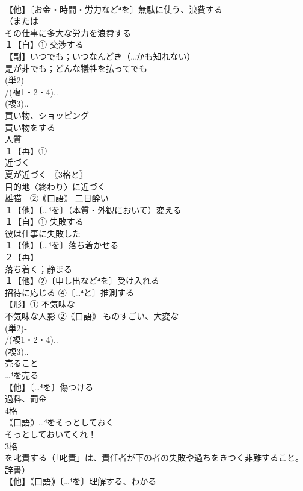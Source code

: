 \documentclass[8pt]{extreport}
\begin{document}
\begin{CJK}{UTF8}{min}
\\	【他】〔お金・時間・労力など⁴を〕無駄に使う、浪費する
\\	（または
\\	その仕事に多大な労力を浪費する
\\	１【自】① 交渉する 
\\	【副】いつでも；いつなんどき（…かも知れない）
\\	是が非でも；どんな犠牲を払ってでも
\\	(単2)‐
\\	/(複1・2・4)..
\\	(複3)..
\\	買い物、ショッピング 
\\	買い物をする
\\	人質 
\\	１【再】①
\\	近づく 
\\	夏が近づく 〖3格と〗
\\	目的地〈終わり〉に近づく
\\	雄猫　②｟口語｠ 二日酔い
\\	１【他】〔…⁴を〕（本質・外観において）変える
\\	１【自】① 失敗する 
\\	彼は仕事に失敗した 
\\	１【他】〔…⁴を〕落ち着かせる
\\	２【再】
\\	落ち着く；静まる
\\	１【他】②〔申し出など⁴を〕受け入れる 
\\	招待に応じる ④〔…⁴と〕推測する
\\	【形】① 不気味な 
\\	不気味な人影 ②｟口語｠ ものすごい、大変な
\\	(単2)‐
\\	/(複1・2・4)..
\\	(複3)..
\\	売ること 
\\	…⁴を売る
\\	【他】〔…⁴を〕傷つける
\\	過料、罰金 
\\	4格 
\\	｟口語｠…⁴をそっとしておく 
\\	そっとしておいてくれ！
\\	3格 
\\	を叱責する（「叱責」は、責任者が下の者の失敗や過ちをきつく非難すること。
\\	辞書）
\\	【他】｟口語｠〔…⁴を〕理解する、わかる 

\end{CJK}
\end{document}
